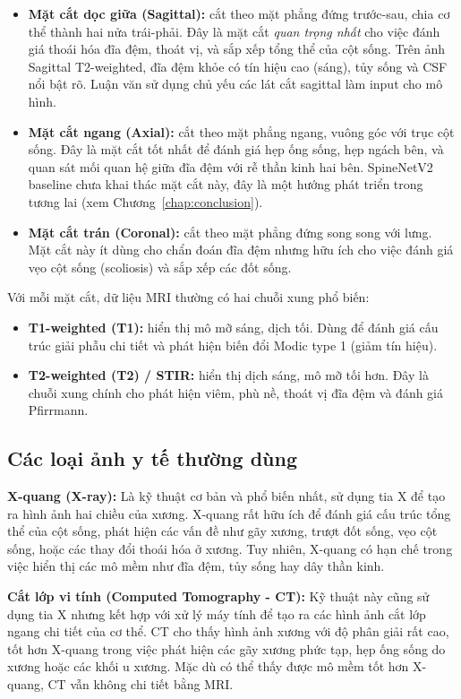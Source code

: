 \begin{itemize}
    \item \textbf{Mặt cắt dọc giữa (Sagittal):} cắt theo mặt phẳng đứng trước-sau, chia cơ thể thành hai nửa trái-phải. Đây là mặt cắt \emph{quan trọng nhất} cho việc đánh giá thoái hóa đĩa đệm, thoát vị, và sắp xếp tổng thể của cột sống. Trên ảnh Sagittal T2-weighted, đĩa đệm khỏe có tín hiệu cao (sáng), tủy sống và CSF nổi bật rõ. Luận văn sử dụng chủ yếu các lát cắt sagittal làm input cho mô hình.
    \item \textbf{Mặt cắt ngang (Axial):} cắt theo mặt phẳng ngang, vuông góc với trục cột sống. Đây là mặt cắt tốt nhất để đánh giá hẹp ống sống, hẹp ngách bên, và quan sát mối quan hệ giữa đĩa đệm với rễ thần kinh hai bên. SpineNetV2 baseline chưa khai thác mặt cắt này, đây là một hướng phát triển trong tương lai (xem Chương~\ref{chap:conclusion}).
    \item \textbf{Mặt cắt trán (Coronal):} cắt theo mặt phẳng đứng song song với lưng. Mặt cắt này ít dùng cho chẩn đoán đĩa đệm nhưng hữu ích cho việc đánh giá vẹo cột sống (scoliosis) và sắp xếp các đốt sống.
\end{itemize}

Với mỗi mặt cắt, dữ liệu MRI thường có hai chuỗi xung phổ biến:
\begin{itemize}
    \item \textbf{T1-weighted (T1):} hiển thị mô mỡ sáng, dịch tối. Dùng để đánh giá cấu trúc giải phẫu chi tiết và phát hiện biến đổi Modic type 1 (giảm tín hiệu).
    \item \textbf{T2-weighted (T2) / STIR:} hiển thị dịch sáng, mô mỡ tối hơn. Đây là chuỗi xung chính cho phát hiện viêm, phù nề, thoát vị đĩa đệm và đánh giá Pfirrmann.
\end{itemize}

\subsection{Các loại ảnh y tế thường dùng}
\textbf{X-quang (X-ray):} Là kỹ thuật cơ bản và phổ biến nhất, sử dụng tia X để tạo ra hình ảnh hai chiều của xương. X-quang rất hữu ích để đánh giá cấu trúc tổng thể của cột sống, phát hiện các vấn đề như gãy xương, trượt đốt sống, vẹo cột sống, hoặc các thay đổi thoái hóa ở xương. Tuy nhiên, X-quang có hạn chế trong việc hiển thị các mô mềm như đĩa đệm, tủy sống hay dây thần kinh.
    
\textbf{Cắt lớp vi tính (Computed Tomography - CT):} Kỹ thuật này cũng sử dụng tia X nhưng kết hợp với xử lý máy tính để tạo ra các hình ảnh cắt lớp ngang chi tiết của cơ thể. CT cho thấy hình ảnh xương với độ phân giải rất cao, tốt hơn X-quang trong việc phát hiện các gãy xương phức tạp, hẹp ống sống do xương hoặc các khối u xương. Mặc dù có thể thấy được mô mềm tốt hơn X-quang, CT vẫn không chi tiết bằng MRI.
    
